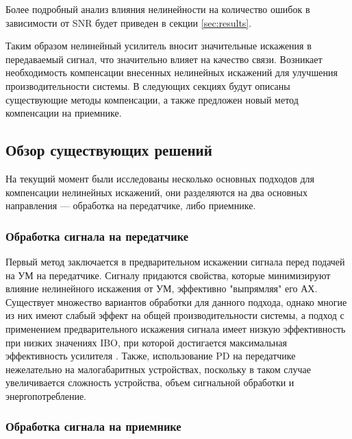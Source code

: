 Более подробный анализ влияния нелинейности на количество ошибок в
зависимости от SNR будет приведен в секции \ref{sec:results}.

Таким образом нелинейный усилитель вносит значительные искажения в
передаваемый сигнал, что значительно влияет на качество связи. Возникает
необходимость компенсации внесенных нелинейных искажений для улучшения
производительности системы. В следующих секциях будут описаны существующие
методы компенсации, а также предложен новый метод компенсации на приемнике.




\subsection{Обзор существующих решений}
На текущий момент были исследованы несколько основных подходов для
компенсации нелинейных искажений, они разделяются на два основных
направления — обработка на передатчике, либо приемнике.

\subsubsection{Обработка сигнала на передатчике}

Первый метод заключается в предварительном искажении сигнала перед
подачей на УМ на передатчике. Сигналу придаются свойства, которые
минимизируют влияние нелинейного искажения от УМ, эффективно "выпрямляя"
его АХ. Существует множество вариантов обработки для данного подхода,
однако многие из них имеют слабый эффект на общей производительности
системы, а подход с применением предварительного искажения сигнала имеет
низкую эффективность при низких значениях IBO, при которой достигается
максимальная эффективность усилителя \cite{sharath2015}
\cite{shabany2008} \cite{eda2001}. Также, использование PD на передатчике
нежелательно на малогабаритных устройствах, поскольку в таком случае
увеличивается сложность устройства, объем сигнальной обработки и энергопотребление.

\subsubsection{Обработка сигнала на приемнике}

